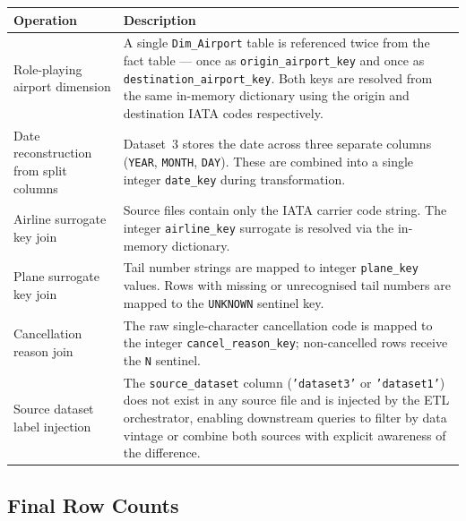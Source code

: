 \documentclass[12pt,a4paper]{article}
\begin{document}
\begin{center}
\begin{tabular}{>{\raggedright\arraybackslash}p{4.5cm}
                >{\raggedright\arraybackslash}p{9.5cm}}
\toprule
\textbf{Operation} & \textbf{Description} \\
\midrule
Role-playing airport dimension &
A single \texttt{Dim\_Airport} table is referenced twice from the fact table
— once as \texttt{origin\_airport\_key} and once as
\texttt{destination\_airport\_key}. Both keys are resolved from the same
in-memory dictionary using the origin and destination IATA codes
respectively. \\[6pt]

Date reconstruction from split columns &
Dataset~3 stores the date across three separate columns
(\texttt{YEAR}, \texttt{MONTH}, \texttt{DAY}).
These are combined into a single integer \texttt{date\_key} during
transformation. \\[6pt]

Airline surrogate key join &
Source files contain only the IATA carrier code string. The integer
\texttt{airline\_key} surrogate is resolved via the in-memory dictionary. \\[6pt]

Plane surrogate key join &
Tail number strings are mapped to integer \texttt{plane\_key} values. Rows
with missing or unrecognised tail numbers are mapped to the \texttt{UNKNOWN}
sentinel key. \\[6pt]

Cancellation reason join &
The raw single-character cancellation code is mapped to the integer
\texttt{cancel\_reason\_key}; non-cancelled rows receive the \texttt{N}
sentinel. \\[6pt]

Source dataset label injection &
The \texttt{source\_dataset} column (\texttt{'dataset3'} or
\texttt{'dataset1'}) does not exist in any source file and is injected by the
ETL orchestrator, enabling downstream queries to filter by data vintage or
combine both sources with explicit awareness of the difference. \\

\bottomrule
\end{tabular}
\end{center}

\subsection{Final Row Counts}
\end{document}
